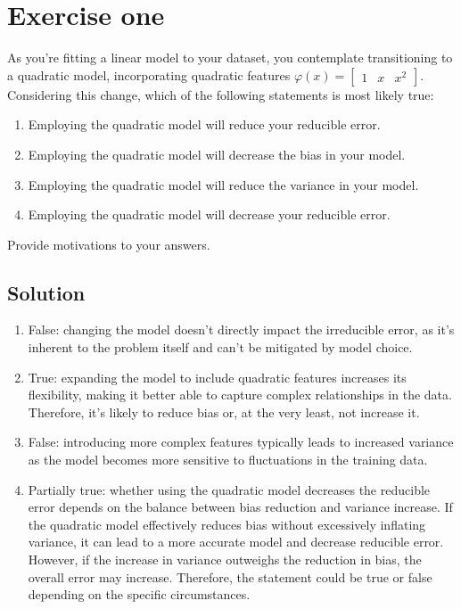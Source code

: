 \section{Exercise one}

As you're fitting a linear model to your dataset, you contemplate transitioning to a quadratic model, incorporating quadratic features $\varphi(x) =\begin{bmatrix} 1 & x & x^2 \end{bmatrix}$. 
Considering this change, which of the following statements is most likely true:
\begin{enumerate}
    \item Employing the quadratic model will reduce your reducible error.
    \item Employing the quadratic model will decrease the bias in your model.
    \item Employing the quadratic model will reduce the variance in your model.
    \item Employing the quadratic model will decrease your reducible error.
\end{enumerate}
Provide motivations to your answers.

\subsection*{Solution}
\begin{enumerate}
    \item False: changing the model doesn't directly impact the irreducible error, as it's inherent to the problem itself and can't be mitigated by model choice.
    \item True: expanding the model to include quadratic features increases its flexibility, making it better able to capture complex relationships in the data. 
        Therefore, it's likely to reduce bias or, at the very least, not increase it.
    \item False: introducing more complex features typically leads to increased variance as the model becomes more sensitive to fluctuations in the training data.
    \item Partially true: whether using the quadratic model decreases the reducible error depends on the balance between bias reduction and variance increase. 
        If the quadratic model effectively reduces bias without excessively inflating variance, it can lead to a more accurate model and decrease reducible error. 
        However, if the increase in variance outweighs the reduction in bias, the overall error may increase. 
        Therefore, the statement could be true or false depending on the specific circumstances.
\end{enumerate}
